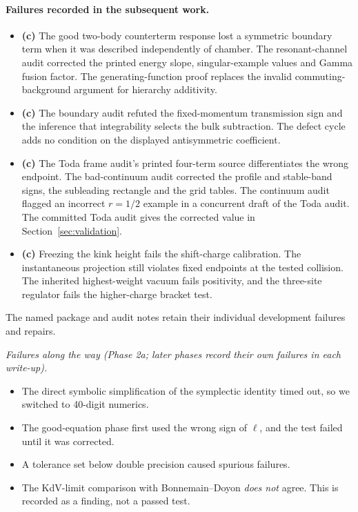 \documentclass[11pt,a4paper]{article}
\newcommand{\Lc}{\textsf{\textbf{(c)}}\xspace}
\theoremstyle{remark}\newtheorem{remark}[proposition]{Remark}
\begin{document}
\paragraph{Failures recorded in the subsequent work.}
\begin{itemize}
\item \Lc The good two-body counterterm response lost a symmetric boundary
term when it was described independently of chamber. The resonant-channel
audit corrected the printed energy slope, singular-example values and
Gamma fusion factor. The generating-function proof replaces the invalid
commuting-background argument for hierarchy additivity.
\item \Lc The boundary audit refuted the fixed-momentum transmission sign
and the inference that integrability selects the bulk subtraction. The
defect cycle adds no condition on the displayed antisymmetric coefficient.
\item \Lc The Toda frame audit's printed four-term source differentiates
the wrong endpoint. The bad-continuum audit corrected the profile and
stable-band signs, the subleading rectangle and the grid tables. The
continuum audit flagged an incorrect $r=1/2$ example in a concurrent
draft of the Toda audit. The committed Toda audit gives the corrected
value in Section~\ref{sec:validation}.
\item \Lc Freezing the kink height fails the shift-charge calibration.
The instantaneous projection still violates fixed endpoints at the
tested collision. The inherited highest-weight vacuum fails positivity,
and the three-site regulator fails the higher-charge bracket test.
\end{itemize}
The named package and audit notes retain their individual development
failures and repairs.


\emph{Failures along the way (Phase 2a; later phases record their own failures in each write-up).}
\begin{itemize}
\item The direct symbolic simplification of the symplectic identity timed out, so we switched to 40-digit numerics.
\item The good-equation phase first used the wrong sign of $\ell$, and the test failed until it was corrected.
\item A tolerance set below double precision caused spurious failures.
\item The KdV-limit comparison with Bonnemain--Doyon \emph{does not} agree. This is recorded as a finding, not a passed test.
\end{itemize}
\end{document}
